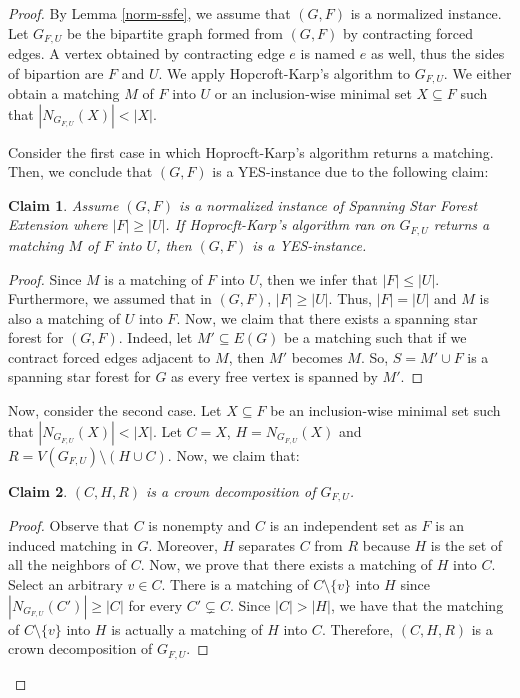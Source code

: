 \documentclass[en]{pracamgr}
\newtheorem{claim}{Claim}
\theoremstyle{definition}
\newcommand{\ssfep}{{\sc Spanning Star Forest Extension}}
\begin{document}
\begin{proof}
	By Lemma \ref{norm-ssfe}, we assume that $(G,F)$ is a normalized instance. Let $G_{F,U}$ be the bipartite graph formed from $(G,F)$ by contracting forced edges. A vertex obtained by contracting edge $e$ is named $e$ as well, thus the sides of bipartion are $F$ and $U$. We apply Hopcroft-Karp's algorithm to $G_{F,U}$. We either obtain a matching $M$ of $F$ into $U$ or an inclusion-wise minimal set $X \subseteq F$ such that $|N_{G_{F,U}}(X)| < |X|$.

	Consider the first case in which Hoprocft-Karp's algorithm returns a matching. Then, we conclude that $(G,F)$ is a YES-instance due to the following claim:
	\begin{claim}
		Assume $(G,F)$ is a normalized instance of \ssfep{} where $|F| \geq |U|$. If Hoprocft-Karp's algorithm ran on $G_{F,U}$ returns a matching $M$ of $F$ into $U$, then $(G,F)$ is a YES-instance.
	\end{claim}

	\begin{proof}
		Since $M$ is a matching of $F$ into $U$, then we infer that $|F| \leq |U|$. Furthermore, we assumed that in $(G,F)$, $|F| \geq |U|$. Thus, $|F|=|U|$ and $M$ is also a matching of $U$ into $F$. Now, we claim that there exists a spanning star forest for $(G,F)$. Indeed, let $M' \subseteq E(G)$ be a matching such that if we contract forced edges adjacent to $M$, then $M'$ becomes $M$. So, $S = M' \cup F$ is a spanning star forest for $G$ as every free vertex is spanned by $M'$.
	\end{proof}

	Now, consider the second case. Let $X \subseteq F$ be an inclusion-wise minimal set such that $|N_{G_{F,U}}(X)| < |X|$. Let $C=X$, $H=N_{G_{F,U}}(X)$ and $R= V(G_{F,U}) \setminus (H \cup C)$. Now, we claim that:
	\begin{claim}
		$(C,H,R)$ is a crown decomposition of $G_{F,U}$.
	\end{claim}
	\begin{proof}
		Observe that $C$ is nonempty and $C$ is an independent set as $F$ is an induced matching in $G$. Moreover, $H$ separates $C$ from $R$ because $H$ is the set of all the neighbors of $C$. Now, we prove that there exists a matching of $H$ into $C$. Select an arbitrary $v \in C$. There is a matching of $C \setminus \{v\}$ into $H$ since $|N_{G_{F,U}}(C')| \geq |C|$ for every $C' \subsetneq C$. Since $|C| > |H|$, we have that the matching of $C \setminus \{v\}$ into $H$ is actually a matching of $H$ into $C$. Therefore, $(C,H,R)$ is a crown decomposition of $G_{F,U}$.
	\end{proof}


\end{proof}
\end{document}
